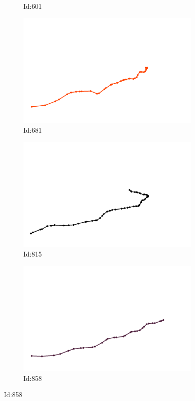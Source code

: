 \documentclass[12pt,twoside]{report}
\begin{document}
\begin{figure}
\begin{subfigure}[b]{0.20\textwidth}
\caption{Id:601}
\end{subfigure}
\begin{subfigure}[b]{0.20\textwidth}
\centering
\includegraphics[width=\textwidth]{../../trajectories/681.png}
\caption{Id:681}
\end{subfigure}
\begin{subfigure}[b]{0.20\textwidth}
\centering
\includegraphics[width=\textwidth]{../../trajectories/815.png}
\caption{Id:815}
\end{subfigure}
\begin{subfigure}[b]{0.20\textwidth}
\centering
\includegraphics[width=\textwidth]{../../trajectories/858.png}
\caption{Id:858}
\end{subfigure}
\end{figure}
\end{document}
